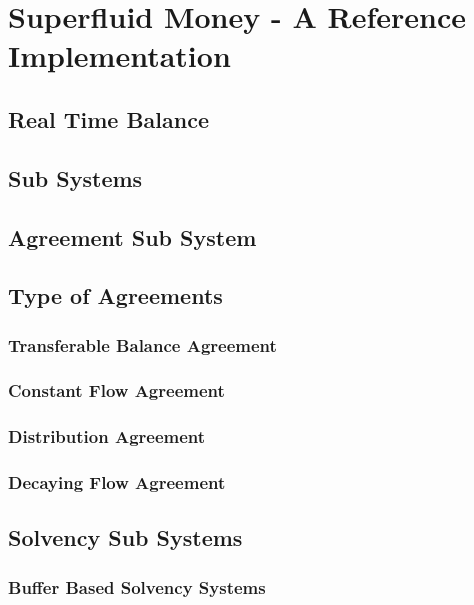 \chapter{Superfluid Money - A Reference Implementation}

\section{Real Time Balance}

\section{Sub Systems}

\section{Agreement Sub System}

\section{Type of Agreements}

\subsection{Transferable Balance Agreement}

\subsection{Constant Flow Agreement}

\subsection{Distribution Agreement}

\subsection{Decaying Flow Agreement}

\section{Solvency Sub Systems}

\subsection{Buffer Based Solvency Systems}

